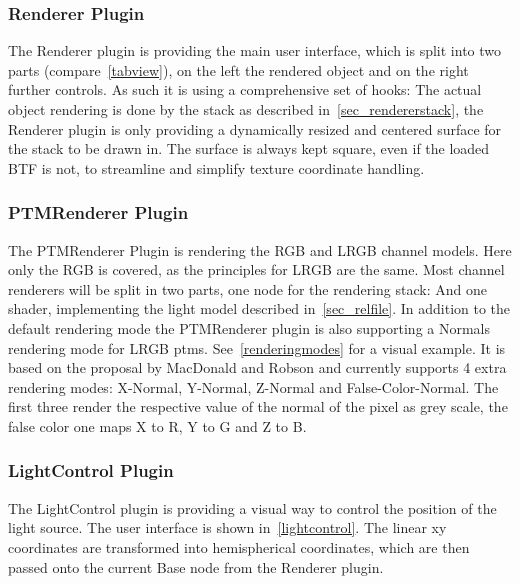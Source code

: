 \subsubsection{Renderer Plugin}
The Renderer plugin is providing the main user interface, which is split into
two parts (compare~\autoref{tabview}), on the left the rendered object and on
the right further controls. As such it is using a comprehensive set of hooks:
The actual object rendering is done by the stack as described
in~\autoref{sec_rendererstack}, the Renderer plugin is only providing a
dynamically resized and centered surface for the stack to be drawn in. The
surface is always kept square, even if the loaded BTF is not, to streamline and
simplify texture coordinate handling.

\subsubsection{PTMRenderer Plugin}\label{sec_ptmrender}
The PTMRenderer Plugin is rendering the RGB and LRGB channel
models. Here only the RGB is covered, as the principles for LRGB are the same.
Most channel renderers will be split in two parts, one node for the rendering
stack:
And one shader, implementing the light model described in~\autoref{sec_relfile}.
In addition to the default rendering mode the PTMRenderer plugin is also
supporting a Normals rendering mode for LRGB ptms. See~\autoref{renderingmodes}
for a visual example. It is based on the proposal by MacDonald and
Robson\cite*{macdonald_polynomial_2010} and currently supports 4 extra rendering
modes: X-Normal, Y-Normal, Z-Normal and False-Color-Normal. The first three
render the respective value of the normal of the pixel as grey scale, the false
color one maps X to R, Y to G and Z to B.

\subsubsection{LightControl Plugin}
The LightControl plugin is providing a visual way to control the position of the
light source. The user interface is shown in~\autoref{lightcontrol}. The
linear xy coordinates are transformed into hemispherical coordinates, which are
then passed onto the current Base node from the Renderer plugin.

